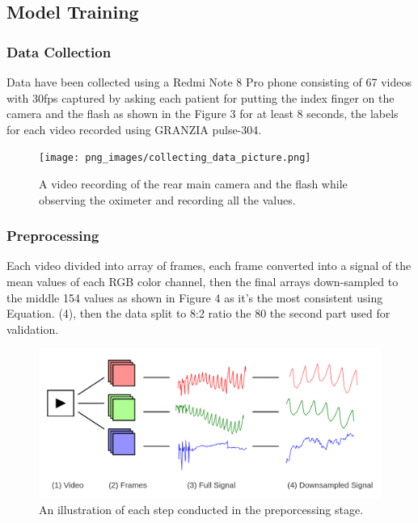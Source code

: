\documentclass{bmcart}
\begin{document}
\subsection*{Model Training}
\subsubsection*{Data Collection}
Data have been collected using a Redmi Note 8 Pro phone consisting of 67 videos
with 30fps captured by asking each patient for putting the index finger on the
camera and the flash as shown in the Figure 3 for at least 8 seconds, the labels
for each video recorded using GRANZIA pulse-304.
\begin{figure}[h!]
  \texttt{[image: png\_images/collecting\_data\_picture.png]}
  \caption{
      A video recording of the rear main camera and the flash while observing
      the oximeter and recording all the values.}
\end{figure}
\FloatBarrier
\subsubsection*{Preprocessing}
Each video divided into array of frames, each frame converted into a signal of
the mean values of each RGB color channel, then the final arrays down-sampled to
the middle 154 values as shown in Figure 4 as it's the most consistent using
Equation. (4), then the data split to 8:2 ratio the 80%
the second part used for validation.
\begin{figure}[h!]
  \includegraphics[width=.9\linewidth]{png_images/preporcessing.png}
  \caption{
      An illustration of each step conducted in the preporcessing stage.}
\end{figure}
\FloatBarrier

\end{document}
